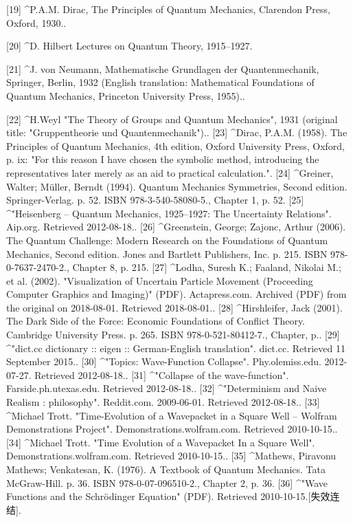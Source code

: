 [19]
^P.A.M. Dirac, The Principles of Quantum Mechanics, Clarendon Press, Oxford, 1930..

[20]
^D. Hilbert Lectures on Quantum Theory, 1915–1927.

[21]
^J. von Neumann, Mathematische Grundlagen der Quantenmechanik, Springer, Berlin, 1932 (English translation: Mathematical Foundations of Quantum Mechanics, Princeton University Press, 1955)..

[22]
^H.Weyl "The Theory of Groups and Quantum Mechanics", 1931 (original title: "Gruppentheorie und Quantenmechanik")..
[23]
^Dirac, P.A.M. (1958). The Principles of Quantum Mechanics, 4th edition, Oxford University Press, Oxford, p. ix: "For this reason I have chosen the symbolic method, introducing the representatives later merely as an aid to practical calculation.".
[24]
^Greiner, Walter; Müller, Berndt (1994). Quantum Mechanics Symmetries, Second edition. Springer-Verlag. p. 52. ISBN 978-3-540-58080-5., Chapter 1, p. 52.
[25]
^"Heisenberg – Quantum Mechanics, 1925–1927: The Uncertainty Relations". Aip.org. Retrieved 2012-08-18..
[26]
^Greenstein, George; Zajonc, Arthur (2006). The Quantum Challenge: Modern Research on the Foundations of Quantum Mechanics, Second edition. Jones and Bartlett Publishers, Inc. p. 215. ISBN 978-0-7637-2470-2., Chapter 8, p. 215.
[27]
^Lodha, Suresh K.; Faaland, Nikolai M.; et al. (2002). "Visualization of Uncertain Particle Movement (Proceeding Computer Graphics and Imaging)" (PDF). Actapress.com. Archived (PDF) from the original on 2018-08-01. Retrieved 2018-08-01..
[28]
^Hirshleifer, Jack (2001). The Dark Side of the Force: Economic Foundations of Conflict Theory. Cambridge University Press. p. 265. ISBN 978-0-521-80412-7., Chapter, p..
[29]
^"dict.cc dictionary :: eigen :: German-English translation". dict.cc. Retrieved 11 September 2015..
[30]
^"Topics: Wave-Function Collapse". Phy.olemiss.edu. 2012-07-27. Retrieved 2012-08-18..
[31]
^"Collapse of the wave-function". Farside.ph.utexas.edu. Retrieved 2012-08-18..
[32]
^"Determinism and Naive Realism : philosophy". Reddit.com. 2009-06-01. Retrieved 2012-08-18..
[33]
^Michael Trott. "Time-Evolution of a Wavepacket in a Square Well – Wolfram Demonstrations Project". Demonstrations.wolfram.com. Retrieved 2010-10-15..
[34]
^Michael Trott. "Time Evolution of a Wavepacket In a Square Well". Demonstrations.wolfram.com. Retrieved 2010-10-15..
[35]
^Mathews, Piravonu Mathews; Venkatesan, K. (1976). A Textbook of Quantum Mechanics. Tata McGraw-Hill. p. 36. ISBN 978-0-07-096510-2., Chapter 2, p. 36.
[36]
^"Wave Functions and the Schrödinger Equation" (PDF). Retrieved 2010-10-15.[失效连结].

